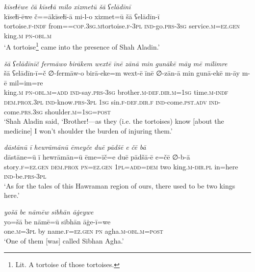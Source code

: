 \ea \label{DG.61}
\textit{kīseɫēwe čā kīseɫā milo xizmetū šā ʕelādīnī} \\ 
\gll kīseɫī-ēwe č==ākīseɫī-ā mi-l-o xizmet=ū šā ʕelādīn-ī \\ 
 tortoise\textsc{\textsc{.f}}\textsc{-indf} from=\textsc{=cop}\textsc{.3sg}\textsc{.m}tortoise\textsc{\textsc{.f}}\textsc{-3pl} \textsc{ind-}go\textsc{.prs}\textsc{-3sg} service\textsc{.m}\textsc{=ez}\textsc{.gen} king\textsc{.m} \textsc{pn}\textsc{-obl}\textsc{.m} \\ 
\glt `A tortoise\footnote{Lit. A tortoise of those tortoises.}  came into the presence of Shah Aladin.'
\z 
 
\ea \label{DG.67}
\textit{šā ʕelādīnīč fermāwo birākem wextē īnē zānā min gunākē māy mē milimre} \\ 
\gll šā ʕelādīn-ī=č ∅-fermāw-o birā-eke=m wext-ē īnē ∅-zān-ā min gunā-ekē m-āy m-ē mil=im=re \\ 
 king\textsc{.m} \textsc{pn}\textsc{-obl}\textsc{.m}\textsc{=add} \textsc{ind-}say\textsc{.prs}\textsc{-3sg} brother\textsc{.m}\textsc{-def}\textsc{.dir}\textsc{.m}\textsc{=1sg} time\textsc{.m}\textsc{-indf} \textsc{dem.prox}\textsc{.3pl} \textsc{ind-}know\textsc{.prs}\textsc{-3pl} \textsc{1sg} sin\textsc{\textsc{.f}}\textsc{-def}\textsc{.dir}\textsc{\textsc{.f}} \textsc{ind-}come\textsc{.pst}\textsc{.adv} \textsc{ind-}come\textsc{.prs}\textsc{.3sg} shoulder\textsc{.m}\textsc{=1sg}\textsc{=\textsc{post}} \\ 
\glt `Shah Aladin said, ‘Brother!—as they (i.e. the tortoises) know [about the medicine] I won’t shoulder the burden of injuring them.'
\z 
 
\ea \label{DP.1}
\textit{dāstānū ī hewrāmānū ēmeyče duē pādšē e čē bā} \\ 
\gll dāstāne=ū ī hewrāmān=ū ēme=īč=e duē pādšā-ē e=čē ∅-b-ā \\ 
 story\textsc{\textsc{.f}}\textsc{=ez}\textsc{.gen} \textsc{dem.prox} \textsc{pn}\textsc{=ez}\textsc{.gen} \textsc{1pl}\textsc{=add}\textsc{=dem} two king\textsc{.m}\textsc{-dir}\textsc{.pl} in=here \textsc{ind-}be\textsc{.prs}\textsc{-3pl} \\ 
\glt `As for the tales of this Hawraman region of ours, there used to be two kings here.'
\z 
 
\ea \label{DP.2}
\textit{yošā be nāmēw sibhān āġeywe} \\ 
\gll yo=šā be nāmē=ū sibhān āġe-ī=we \\ 
 one\textsc{.m}\textsc{=3pl} by name\textsc{\textsc{.f}}\textsc{=ez}\textsc{.gen} \textsc{pn} agha\textsc{.m}\textsc{-obl}\textsc{.m}\textsc{=\textsc{post}} \\ 
\glt `One of them [was] called Sibhan Agha.'
\z 
 
